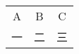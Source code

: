 \begin{tabular}{|ccc|}
\hline \rowcolor{lightgray} A & B & C \\
  一 & 二 & 三 \\\hline %
\end{tabular}
